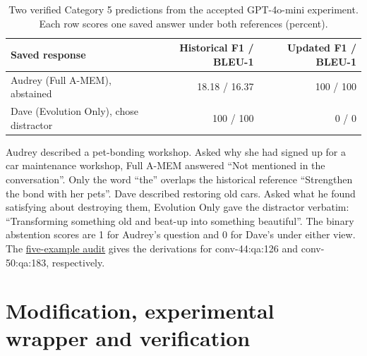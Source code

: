 \documentclass[11pt,a4paper]{article}
\begin{document}
\begin{table}[H]\centering\small
\begin{tabular}{@{}lrr@{}}
\toprule
Saved response & Historical F1 / BLEU-1 & Updated F1 / BLEU-1 \\
\midrule
Audrey (Full A-MEM), abstained & 18.18 / 16.37 & 100 / 100 \\
Dave (Evolution Only), chose distractor & 100 / 100 & 0 / 0 \\
\bottomrule\end{tabular}
\caption{Two verified Category 5 predictions from the accepted GPT-4o-mini experiment. Each row scores one saved answer under both references (percent).}\label{tab3}
\end{table}
Audrey described a pet-bonding workshop. Asked why she had signed up for a car maintenance workshop, Full A-MEM answered “Not mentioned in the conversation”. Only the word “the” overlaps the historical reference “Strengthen the bond with her pets”. Dave described restoring old cars. Asked what he found satisfying about destroying them, Evolution Only gave the distractor verbatim: “Transforming something old and beat-up into something beautiful”. The binary abstention scores are 1 for Audrey’s question and 0 for Dave’s under either view. The \href{https://github.com/alistairkung/A-mem-reproducibility/blob/930254d9c4c1c430899a25fe42a94fa164a85812/reports/adversarial_scoring_audit/five_examples.md}{five-example audit} gives the derivations for conv-44:qa:126 and conv-50:qa:183, respectively.

\section{Modification, experimental wrapper and verification}
\end{document}
